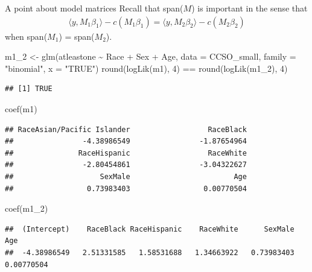 \documentclass[
  ignorenonframetext,
]{beamer}
\newenvironment{Shaded}{\begin{snugshade}}{\end{snugshade}}
\newcommand{\AttributeTok}[1]{\textcolor[rgb]{0.77,0.63,0.00}{#1}}
\newcommand{\DecValTok}[1]{\textcolor[rgb]{0.00,0.00,0.81}{#1}}
\newcommand{\FunctionTok}[1]{\textcolor[rgb]{0.00,0.00,0.00}{#1}}
\newcommand{\NormalTok}[1]{#1}
\newcommand{\OtherTok}[1]{\textcolor[rgb]{0.56,0.35,0.01}{#1}}
\newcommand{\SpecialCharTok}[1]{\textcolor[rgb]{0.00,0.00,0.00}{#1}}
\newcommand{\StringTok}[1]{\textcolor[rgb]{0.31,0.60,0.02}{#1}}
\begin{document}
\begin{frame}[fragile]{A point about model matrices}
\protect\hypertarget{a-point-about-model-matrices}{}
Recall that span(\(M\)) is important in the sense that \begin{align*}
\langle y, M_1\beta_1 \rangle - c(M_1\beta_1) = \langle y, M_2\beta_2 \rangle - c(M_2\beta_2)
\end{align*} when span(\(M_1\)) = span(\(M_2\)).

\vspace{12pt}
\tiny

\begin{Shaded}
\begin{Highlighting}[]
\NormalTok{m1\_2 }\OtherTok{\textless{}{-}} \FunctionTok{glm}\NormalTok{(atleastone }\SpecialCharTok{\textasciitilde{}}\NormalTok{ Race }\SpecialCharTok{+}\NormalTok{ Sex }\SpecialCharTok{+}\NormalTok{ Age, }\AttributeTok{data =}\NormalTok{ CCSO\_small, }
          \AttributeTok{family =} \StringTok{"binomial"}\NormalTok{, }\AttributeTok{x =} \StringTok{"TRUE"}\NormalTok{)}
\FunctionTok{round}\NormalTok{(}\FunctionTok{logLik}\NormalTok{(m1), }\DecValTok{4}\NormalTok{) }\SpecialCharTok{==} \FunctionTok{round}\NormalTok{(}\FunctionTok{logLik}\NormalTok{(m1\_2), }\DecValTok{4}\NormalTok{)}
\end{Highlighting}
\end{Shaded}

\begin{verbatim}
## [1] TRUE
\end{verbatim}

\begin{Shaded}
\begin{Highlighting}[]
\FunctionTok{coef}\NormalTok{(m1)}
\end{Highlighting}
\end{Shaded}

\begin{verbatim}
## RaceAsian/Pacific Islander                  RaceBlack 
##                -4.38986549                -1.87654964 
##               RaceHispanic                  RaceWhite 
##                -2.80454861                -3.04322627 
##                    SexMale                        Age 
##                 0.73983403                 0.00770504
\end{verbatim}

\begin{Shaded}
\begin{Highlighting}[]
\FunctionTok{coef}\NormalTok{(m1\_2)}
\end{Highlighting}
\end{Shaded}

\begin{verbatim}
##  (Intercept)    RaceBlack RaceHispanic    RaceWhite      SexMale          Age 
##  -4.38986549   2.51331585   1.58531688   1.34663922   0.73983403   0.00770504
\end{verbatim}
\end{frame}
\end{document}
